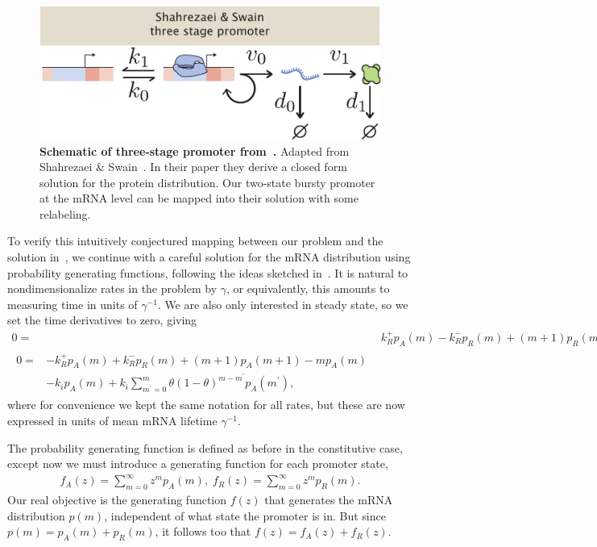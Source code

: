 \begin{figure}
\centering
\includegraphics{../figures/si/figS0X_Shahrezaei_promoter.pdf}
\caption{\textbf{Schematic of three-stage promoter from~\cite{Shahrezaei2008}.}
Adapted from Shahrezaei \& Swain~\cite{Shahrezaei2008}. In their paper they
derive a closed form solution for the protein distribution. Our two-state bursty
promoter at the mRNA level can be mapped into their solution with some
relabeling.}
\label{fig:shahrezaei}
\end{figure}

To verify this intuitively conjectured mapping between our problem and the
solution in~\cite{Shahrezaei2008}, we continue with a careful solution for the
mRNA distribution using probability generating functions, following the ideas
sketched in~\cite{Shahrezaei2008}. It is natural to nondimensionalize rates in
the problem by $\gamma$, or equivalently, this amounts to measuring time in
units of $\gamma^{-1}$. We are also only interested in steady state, so we set
the time derivatives to zero, giving
\begin{align}
0 =& k_R^+ p_A(m) - k_R^- p_R(m) + (m+1) p_R(m+1) - m p_R(m)
\\
\begin{split}
0 =& - k_R^+ p_A(m) + k_R^- p_R(m) + (m+1) p_A(m+1) - m p_A(m) 
\\
&- k_i p_A(m) + k_i \sum_{m^\prime=0}^m \theta(1-\theta)^{m-m^\prime} p_A(m^\prime),
\end{split}
\end{align}
where for convenience we kept the same notation for all rates, but these are
now expressed in units of mean mRNA lifetime $\gamma^{-1}$.
        
The probability generating function is defined as before in the constitutive
case, except now we must introduce a generating function for each promoter
state,
\begin{align}
f_A(z) = \sum_{m=0}^\infty z^m p_A(m),
\;
f_R(z) = \sum_{m=0}^\infty z^m p_R(m).
\end{align}
Our real objective is the generating function $f(z)$ that generates the mRNA
distribution $p(m)$, independent of what state the promoter is in. But since
$p(m) = p_A(m) + p_R(m)$, it follows too that $f(z) = f_A(z) + f_R(z)$.

